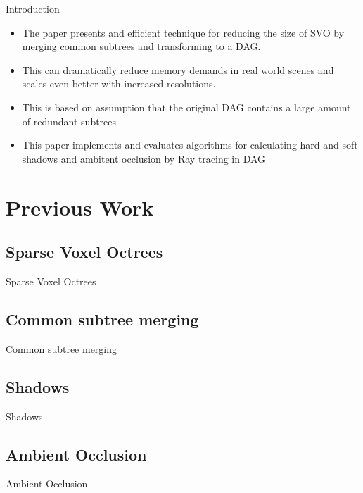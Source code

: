 \documentclass{beamer}
\begin{document}
\begin{frame}{Introduction}
  \begin{itemize}
  \item {
  		The paper presents and efficient technique for reducing the size of SVO by merging common subtrees and transforming to a DAG.
    }
    \item{
    	This can dramatically reduce memory demands in real world scenes and scales even better with increased resolutions.
    }
    \item{
    	This is based on assumption that the original DAG contains a large amount of redundant subtrees
    }
    \item{
    	This paper implements and evaluates algorithms for calculating hard and soft shadows and ambitent occlusion by Ray tracing in DAG 
    }
 
  \end{itemize}
 
\end{frame}

\section{Previous Work}
\subsection{Sparse Voxel Octrees}
\begin{frame}{Sparse Voxel Octrees}
\end{frame}

\subsection{Common subtree merging}
\begin{frame}{Common subtree merging}
\end{frame}

\subsection{Shadows}
\begin{frame}{Shadows}
\end{frame}

\subsection{Ambient Occlusion}
\begin{frame}{Ambient Occlusion}
\end{frame}
\end{document}
